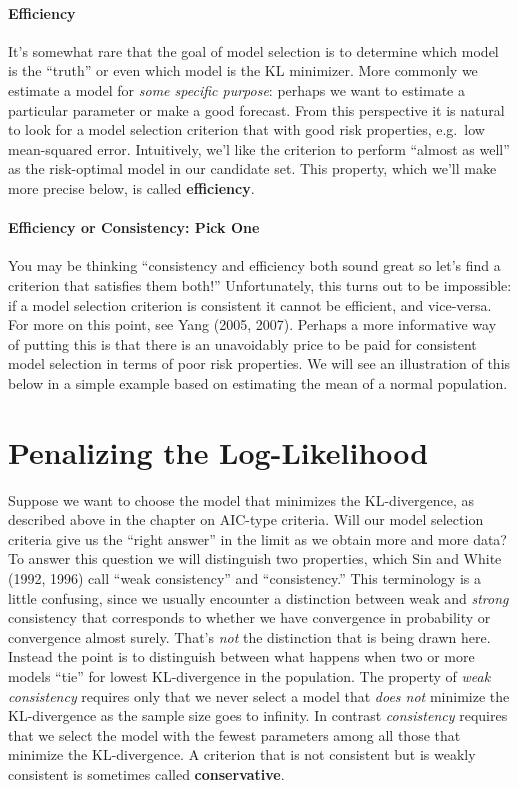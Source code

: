 \paragraph{Efficiency} 
It's somewhat rare that the goal of model selection is to determine which model is the ``truth'' or even which model is the KL minimizer. 
More commonly we estimate a model for \emph{some specific purpose}: perhaps we want to estimate a particular parameter or make a good forecast. 
From this perspective it is natural to look for a model selection criterion that with good risk properties, e.g.\ low mean-squared error.
Intuitively, we'l like the criterion to perform ``almost as well'' as the risk-optimal model in our candidate set. 
This property, which we'll make more precise below, is called \textbf{efficiency}. 

\paragraph{Efficiency or Consistency: Pick One}
You may be thinking ``consistency and efficiency both sound great so let's find a criterion that satisfies them both!''
Unfortunately, this turns out to be impossible: if a model selection criterion is consistent it cannot be efficient, and vice-versa. 
For more on this point, see Yang (2005, 2007).
Perhaps a more informative way of putting this is that there is an unavoidably price to be paid for consistent model selection in terms of poor risk properties.
We will see an illustration of this below in a simple example based on estimating the mean of a normal population.


\section{Penalizing the Log-Likelihood}
Suppose we want to choose the model that minimizes the KL-divergence, as described above in the chapter on AIC-type criteria.
Will our model selection criteria give us the ``right answer'' in the limit as we obtain more and more data?
To answer this question we will distinguish two properties, which Sin and White (1992, 1996) call ``weak consistency'' and ``consistency.''
This terminology is a little confusing, since we usually encounter a distinction between weak and \emph{strong} consistency that corresponds to whether we have convergence in probability or convergence almost surely.
That's \emph{not} the distinction that is being drawn here.
Instead the point is to distinguish between what happens when two or more models ``tie'' for lowest KL-divergence in the population.
The property of \emph{weak consistency} requires only that we never select a model that \emph{does not} minimize the KL-divergence as the sample size goes to infinity.
In contrast \emph{consistency} requires that we select the model with the fewest parameters among all those that minimize the KL-divergence.
A criterion that is not consistent but is weakly consistent is sometimes called \textbf{conservative}.

